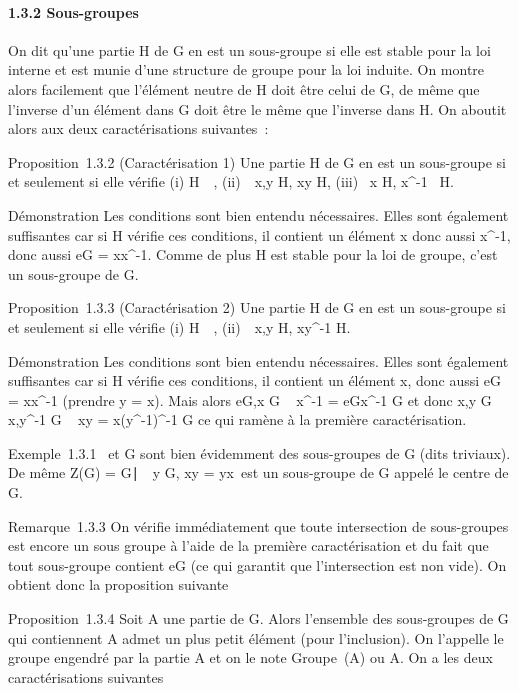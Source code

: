\paragraph{1.3.2 Sous-groupes}

On dit qu'une partie H de G en est un sous-groupe si elle est stable
pour la loi interne et est munie d'une structure de groupe pour la loi
induite. On montre alors facilement que l'élément neutre de H doit être
celui de G, de même que l'inverse d'un élément dans G doit être le même
que l'inverse dans H. On aboutit alors aux deux caractérisations
suivantes~:

Proposition~1.3.2 (Caractérisation 1) Une partie H de G en est un
sous-groupe si et seulement si elle vérifie (i)
H\neq~\varnothing~, (ii)\forall~~x,y \in H,
xy \in H, (iii) \forall~x \in H, x^-1~ \in H.

Démonstration Les conditions sont bien entendu nécessaires. Elles sont
également suffisantes car si H vérifie ces conditions, il contient un
élément x donc aussi x^-1, donc aussi eG =
xx^-1. Comme de plus H est stable pour la loi de groupe,
c'est un sous-groupe de G.

Proposition~1.3.3 (Caractérisation 2) Une partie H de G en est un
sous-groupe si et seulement si elle vérifie (i)
H\neq~\varnothing~, (ii)\forall~~x,y \in H,
xy^-1 \in H.

Démonstration Les conditions sont bien entendu nécessaires. Elles sont
également suffisantes car si H vérifie ces conditions, il contient un
élément x, donc aussi eG = xx^-1 (prendre y = x).
Mais alors eG,x \in G \rigtharrow~ x^-1 =
eGx^-1 \in G et donc x,y \in G \rigtharrow~ x,y^-1 \in G
\rigtharrow~ xy = x(y^-1)^-1 \in G ce qui ramène à la première
caractérisation.

Exemple~1.3.1 \e\ et G sont bien
évidemment des sous-groupes de G (dits triviaux). De même Z(G) =
\x \in
G∣\forall~~y \in G, xy =
yx\ est un sous-groupe de G appelé le centre de G.

Remarque~1.3.3 On vérifie immédiatement que toute intersection de
sous-groupes est encore un sous groupe à l'aide de la première
caractérisation et du fait que tout sous-groupe contient eG
(ce qui garantit que l'intersection est non vide). On obtient donc la
proposition suivante

Proposition~1.3.4 Soit A une partie de G. Alors l'ensemble des
sous-groupes de G qui contiennent A admet un plus petit élément (pour
l'inclusion). On l'appelle le groupe engendré par la partie A et on le
note Groupe~(A) ou \langle
A\rangle . On a les deux caractérisations suivantes

